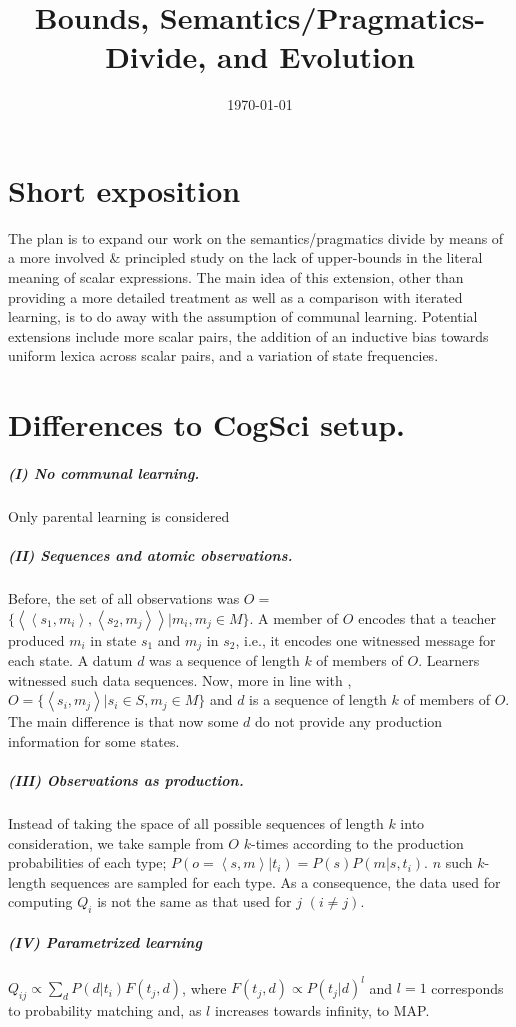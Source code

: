 \documentclass[11pt]{article}
\title{Bounds, Semantics/Pragmatics-Divide, and Evolution}
\author{%
    \today
}
\date{}
\newcommand{\tuple}[1]{\ensuremath{\left\langle #1 \right\rangle}}
\begin{document}
\maketitle

\section{Short exposition}
The plan is to expand our work on the semantics/pragmatics divide by means of a more involved \& principled study on the lack of upper-bounds in the literal meaning of scalar expressions. The main idea of this extension, other than providing a more detailed treatment as well as a comparison with iterated learning, is to do away with the assumption of communal learning. Potential extensions include more scalar pairs, the addition of an inductive bias towards uniform lexica across scalar pairs, and a variation of state frequencies.

\section{Differences to CogSci setup.}
\subparagraph{(I) No communal learning.} Only parental learning is considered

\subparagraph{(II) Sequences and atomic observations.} Before, the set of all observations was $O =$\linebreak  $\{\tuple{\tuple{s_1,m_i},\tuple{s_2,m_j}} | m_i, m_j \in M\}$. A member of $O$ encodes that a teacher produced $m_i$ in state $s_1$ and $m_j$ in $s_2$, i.e., it encodes one witnessed message for each state. A datum $d$ was a sequence of length $k$ of members of $O$. Learners witnessed such data sequences. Now, more in line with \citet{griffiths+kalish:2007}, $O = \{\tuple{s_i,m_j} | s_i \in S, m_j \in M\}$ and $d$ is a sequence of length $k$ of members of $O$. The main difference is that now some $d$ do not provide any production information for some states.

\subparagraph{(III) Observations as production.} Instead of taking the space of all possible sequences of length $k$ into consideration, we take sample from $O$ $k$-times according to the production probabilities of each type; $P(o = \tuple{s,m} | t_i) = P(s) P(m|s,t_i)$. $n$ such $k$-length sequences are sampled for each type. As a consequence, the data used for computing $Q_i$ is not the same as that used for $j$ $(i \neq j)$.

\subparagraph{(IV) Parametrized learning} $Q_{ij} \propto \sum_d P(d|t_i) F(t_j,d)$, where $F(t_j,d) \propto P(t_j|d)^l$ and $l =1$ corresponds to probability matching and, as $l$ increases towards infinity, to MAP.  	      
\end{document}
